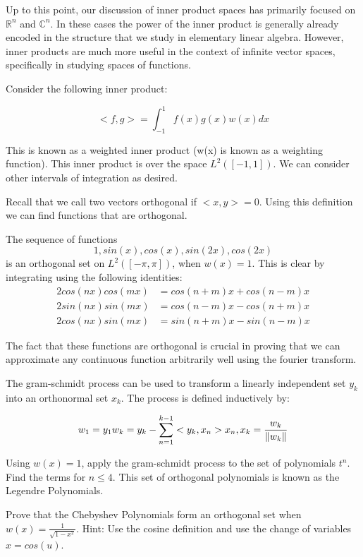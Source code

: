 \label{OrthoPoly}


Up to this point, our discussion of inner product spaces has primarily focused on $\mathbb{R}^{n}$ and $\mathbb{C}^{n}$. In these cases the power of the inner product is generally already encoded in the structure that we study in elementary linear algebra. However, inner products are much more useful in the context of infinite vector spaces, specifically in studying spaces of functions.

Consider the following inner product:

\[
<f,g> = \int_{-1}^1 f(x) g(x) w(x) dx
\]

This is known as a weighted inner product (w(x) is known as a weighting function). This inner product is over the space $L^2([-1,1])$. We can consider other intervals of integration as desired.

Recall that we call two vectors orthogonal if $<x,y> = 0$. Using this definition we can find functions that are orthogonal.

\begin{example}
The sequence of functions
\[
1,sin(x),cos(x),sin(2x),cos(2x)
\]
is an orthogonal set on $L^2([-\pi,\pi])$, when $w(x) = 1$. This is clear by integrating using the following identities:
\begin{align*}
2 cos(nx)cos(mx) &= cos(n+m)x + cos(n-m)x \\
2 sin(nx)sin(mx) &= cos(n-m)x - cos(n+m)x \\
2 cos(nx)sin(mx) &= sin(n+m)x - sin(n-m)x
\end{align*}

The fact that these functions are orthogonal is crucial in proving that we can approximate any continuous function arbitrarily well using the fourier transform.
\end{example}

\begin{problem}
The gram-schmidt process can be used to transform a linearly independent set $y_k$ into an orthonormal set $x_k$. The process is defined inductively by:

\[
w_1 = y_1
w_k = y_k - \sum_{n=1}^{k-1} <y_k,x_n>x_n, x_k = \frac{w_k}{\lVert w_k\rVert}
\]

Using $w(x) = 1$, apply the gram-schmidt process to the set of polynomials $t^n$. Find the terms for $n \leq 4$. This set of orthogonal polynomials is known as the Legendre Polynomials.
\end{problem}
\begin{problem}
Prove that the Chebyshev Polynomials form an orthogonal set when $w(x) = \frac{1}{\sqrt{1-x^2}}$. Hint: Use the cosine definition and use the change of variables $x = cos(u)$.
\end{problem}

